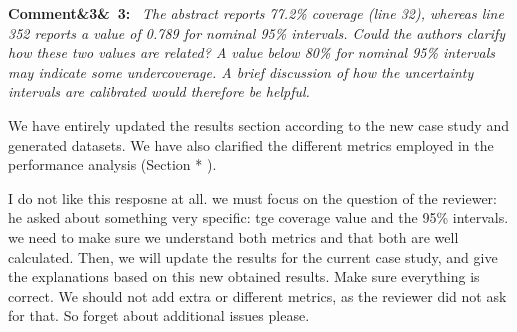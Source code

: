 \documentclass[11pt]{article}
\newenvironment{rcomment}[1]{\par\bigskip\noindent\textbf{Comment\ifx&#1&\else\ #1\fi:}\ \itshape}{\par}
\begin{document}
\begin{rcomment}{3}
The abstract reports 77.2\% coverage (line 32), whereas line 352 reports a value of 0.789 for nominal 95\% intervals.
Could the authors clarify how these two values are related? A value below 80\% for nominal 95\% intervals may indicate
some undercoverage. A brief discussion of how the uncertainty intervals are calibrated would therefore be helpful.
\end{rcomment}
We have entirely updated the results section according to the new case study and generated datasets. 
We have also clarified the different metrics employed in the performance analysis (Section * ). 


	I do not like this resposne at all. we must focus on the question of the reviewer: he asked about something very specific: tge coverage value and the 95\% intervals. we need to make sure we  understand both metrics and that both are well calculated. Then, we will update the results for the current case study, and give the explanations based on this new obtained results. 
	Make sure everything is correct. 
	We should not add extra or different metrics, as the reviewer did not ask for that. So forget about additional issues please. 
\end{document}
